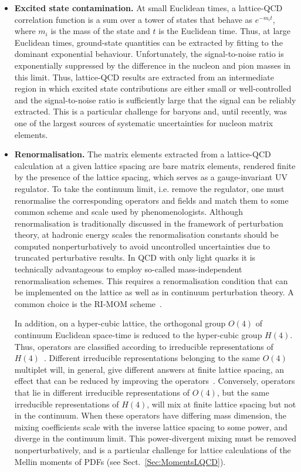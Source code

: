 \begin{itemize}
\item {\bfseries Excited state contamination.} At small Euclidean times, a lattice-QCD correlation function
is a sum over a tower of states that behave as $e^{-m_it}$, where $m_i$ is the 
mass of the state and $t$ is the Euclidean time. Thus, at large Euclidean times,
ground-state quantities can be extracted by fitting to the dominant exponential behaviour.
Unfortunately, the signal-to-noise ratio
is exponentially suppressed by the difference in the nucleon and pion masses in this limit. Thus, lattice-QCD results
are extracted from an intermediate region in which excited state contributions are 
either small or well-controlled and the signal-to-noise ratio is sufficiently large that
the signal can be reliably extracted. This is a particular challenge for baryons and,
until recently, was one of the largest sources of systematic uncertainties for
nucleon matrix elements.

\item {\bfseries Renormalisation.} The matrix elements extracted from a 
lattice-QCD calculation at a given lattice spacing are bare matrix elements,
rendered finite by the presence of the lattice spacing, which serves
as a gauge-invariant UV regulator. To take the continuum limit,
i.e. remove the regulator, one must renormalise the corresponding
operators and fields and match them to some common scheme and scale used 
by phenomenologists. Although renormalisation is traditionally
discussed in the framework of perturbation theory, at hadronic energy
scales the renormalisation constants should be computed
nonperturbatively to avoid uncontrolled uncertainties due to 
truncated perturbative results.
%
In QCD with only light quarks it is technically
advantageous to employ so-called mass-independent renormalisation
schemes.
%
This requires a renormalisation condition that can be
implemented on the lattice as well as in continuum perturbation
theory. A common choice is the RI-MOM scheme~\cite{Martinelli:1994ty}.

In addition, on a hyper-cubic lattice, the orthogonal group $O(4)$ of
continuum Euclidean space-time is reduced to the hyper-cubic group
$H(4)$.
%
Thus, operators are classified according to irreducible
representations of $H(4)$~\cite{Gockeler:1996mu}.
%
Different
irreducible representations belonging to the same $O(4)$ multiplet
will, in general, give different answers at finite lattice spacing, an
effect that can be reduced by improving the
operators~\cite{Gockeler:2004wp}.
%
Conversely, operators that lie in
different irreducible representations of $O(4)$, but the same irreducible
representations of $H(4)$, will mix at finite lattice spacing but not
in the continuum. When these operators have differing mass dimension,
the mixing coefficients scale with the inverse lattice spacing to some
power, and diverge in the continuum limit.
%
This power-divergent mixing
must be removed nonperturbatively, and is a particular challenge for
lattice calculations of the Mellin moments of PDFs (see
Sect.~\ref{Sec:MomentsLQCD}).


\end{itemize}
